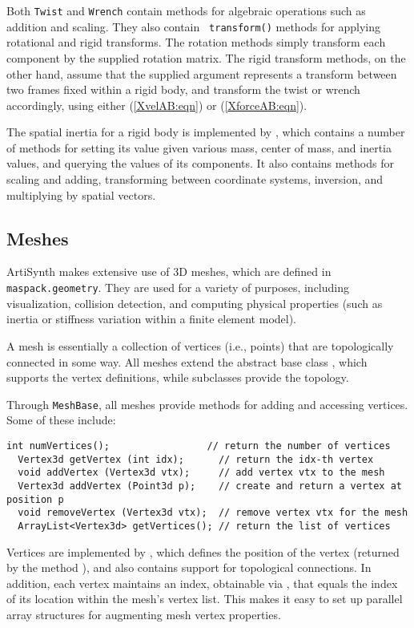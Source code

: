 Both {\tt Twist} and {\tt Wrench} contain methods for algebraic
operations such as addition and scaling. They also contain {\tt
transform()} methods for applying rotational and rigid transforms.
The rotation methods simply transform each component by the supplied
rotation matrix. The rigid transform methods, on the other hand,
assume that the supplied argument represents a transform between two
frames fixed within a rigid body, and transform the twist or wrench
accordingly, using either (\ref{XvelAB:eqn}) or (\ref{XforceAB:eqn}).

The spatial inertia for a rigid body is implemented by
, which contains a
number of methods for setting its value given various mass, center of
mass, and inertia values, and querying the values of its components.
It also contains methods for scaling and adding, transforming between
coordinate systems, inversion, and multiplying by spatial vectors.

\subsection{Meshes}
\label{Meshes:sec}

ArtiSynth makes extensive use of 3D meshes, which are defined in {\tt
maspack.geometry}.  They are used for a variety of purposes, including
visualization, collision detection, and computing physical properties
(such as inertia or stiffness variation within a finite element
model).

A mesh is essentially a collection of vertices
(i.e., points) that are topologically connected in some way.  All
meshes extend the abstract base class
, which supports the vertex
definitions, while subclasses provide the topology.

Through {\tt MeshBase}, all meshes provide methods for
adding and accessing vertices. Some of these include:
%
\begin{lstlisting}[]
  int numVertices();                 // return the number of vertices
  Vertex3d getVertex (int idx);      // return the idx-th vertex
  void addVertex (Vertex3d vtx);     // add vertex vtx to the mesh
  Vertex3d addVertex (Point3d p);    // create and return a vertex at position p
  void removeVertex (Vertex3d vtx);  // remove vertex vtx for the mesh
  ArrayList<Vertex3d> getVertices(); // return the list of vertices
\end{lstlisting}
%
Vertices are implemented by ,
which defines the position of the vertex (returned by the method
), and also
contains support for topological connections. In addition, each vertex
maintains an index, obtainable via
, that equals the
index of its location within the mesh's vertex list. This makes it
easy to set up parallel array structures for augmenting mesh vertex
properties.

